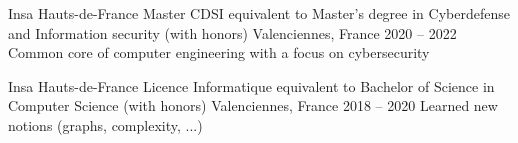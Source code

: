 
\begin{cventries}
  \cventry
    {Insa Hauts-de-France} %
    {Master CDSI equivalent to Master's degree in Cyberdefense and Information security (with honors)} %
    {Valenciennes, France} %
    {2020 – 2022} %
    {Common core of computer engineering with a focus on cybersecurity}
    
  \cventry
    {Insa Hauts-de-France} %
    {Licence Informatique equivalent to Bachelor of Science in Computer Science (with honors)} %
    {Valenciennes, France} %
    {2018 – 2020} %
    {Learned new notions (graphs, complexity, ...)}

\end{cventries}
